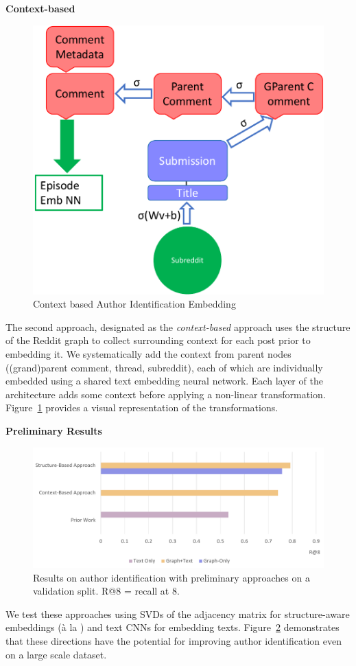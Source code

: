 \textbf{Context-based}
\begin{figure}
    \centering
    \includegraphics[width=0.5\linewidth]{future_work/figures/reddit_context_based.pdf}
    \caption{Context based Author Identification Embedding}
    \label{fig:future_work:scale:preliminary:reddit_context_embedding}
\end{figure}
The second approach, designated as the \textit{context-based} approach uses the structure of the Reddit graph to collect surrounding context for each post prior to embedding it. 
We systematically add the context from parent nodes ((grand)parent comment, thread, subreddit), each of which are individually embedded using a shared text embedding neural network.
Each layer of the architecture adds some context before applying a non-linear transformation.
Figure~\ref{fig:future_work:scale:preliminary:reddit_context_embedding} provides a  visual representation of the transformations.

\textbf{Preliminary Results}
\begin{figure}
    \centering
    \includegraphics[width=0.8\linewidth]{future_work/figures/reddit_scale_graph.pdf}
    \caption{Results on author identification with preliminary approaches on a validation split. R@8 = recall at 8.}
    \label{fig:future_work:scale:preliminary:results}
\end{figure}
We test these approaches using SVDs of the adjacency matrix for structure-aware embeddings (à la \citet{agterberg2020vertex}) and text CNNs for embedding texts.
Figure~\ref{fig:future_work:scale:preliminary:results} demonstrates that these directions have the potential for improving author identification even on a large scale dataset.

